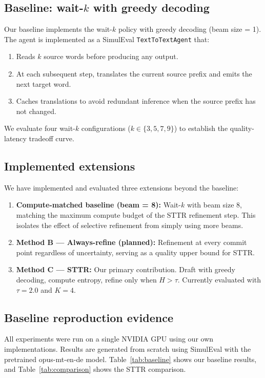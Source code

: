 \subsection{Baseline: wait-$k$ with greedy decoding}

Our baseline implements the wait-$k$ policy \citep{ma2019stacl} with greedy decoding (beam size = 1). The agent is implemented as a SimulEval \texttt{TextToTextAgent} that:
\begin{enumerate}[leftmargin=*]
    \item Reads $k$ source words before producing any output.
    \item At each subsequent step, translates the current source prefix and emits the next target word.
    \item Caches translations to avoid redundant inference when the source prefix has not changed.
\end{enumerate}

We evaluate four wait-$k$ configurations ($k \in \{3, 5, 7, 9\}$) to establish the quality-latency tradeoff curve.

\subsection{Implemented extensions}

We have implemented and evaluated three extensions beyond the baseline:

\begin{enumerate}[leftmargin=*]
    \item \textbf{Compute-matched baseline (beam = 8):} Wait-$k$ with beam size 8, matching the maximum compute budget of the STTR refinement step. This isolates the effect of selective refinement from simply using more beams.
    \item \textbf{Method B --- Always-refine (planned):} Refinement at every commit point regardless of uncertainty, serving as a quality upper bound for STTR.
    \item \textbf{Method C --- STTR:} Our primary contribution. Draft with greedy decoding, compute entropy, refine only when $H > \tau$. Currently evaluated with $\tau = 2.0$ and $K = 4$.
\end{enumerate}

\subsection{Baseline reproduction evidence}

All experiments were run on a single NVIDIA GPU using our own implementations. Results are generated from scratch using SimulEval with the pretrained opus-mt-en-de model. Table~\ref{tab:baseline} shows our baseline results, and Table~\ref{tab:comparison} shows the STTR comparison.

